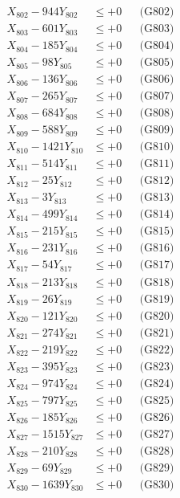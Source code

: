 \documentclass[a4paper,10pt]{article}
\begin{document}
{\begin{align}
X_{802} - 944Y_{802} &\leq +0 && \text{(G802)} \\
X_{803} - 601Y_{803} &\leq +0 && \text{(G803)} \\
X_{804} - 185Y_{804} &\leq +0 && \text{(G804)} \\
X_{805} - 98Y_{805} &\leq +0 && \text{(G805)} \\
X_{806} - 136Y_{806} &\leq +0 && \text{(G806)} \\
X_{807} - 265Y_{807} &\leq +0 && \text{(G807)} \\
X_{808} - 684Y_{808} &\leq +0 && \text{(G808)} \\
X_{809} - 588Y_{809} &\leq +0 && \text{(G809)} \\
X_{810} - 1421Y_{810} &\leq +0 && \text{(G810)} \\
\allowbreak
X_{811} - 514Y_{811} &\leq +0 && \text{(G811)} \\
X_{812} - 25Y_{812} &\leq +0 && \text{(G812)} \\
X_{813} - 3Y_{813} &\leq +0 && \text{(G813)} \\
X_{814} - 499Y_{814} &\leq +0 && \text{(G814)} \\
X_{815} - 215Y_{815} &\leq +0 && \text{(G815)} \\
X_{816} - 231Y_{816} &\leq +0 && \text{(G816)} \\
X_{817} - 54Y_{817} &\leq +0 && \text{(G817)} \\
X_{818} - 213Y_{818} &\leq +0 && \text{(G818)} \\
X_{819} - 26Y_{819} &\leq +0 && \text{(G819)} \\
X_{820} - 121Y_{820} &\leq +0 && \text{(G820)} \\
\allowbreak
X_{821} - 274Y_{821} &\leq +0 && \text{(G821)} \\
X_{822} - 219Y_{822} &\leq +0 && \text{(G822)} \\
X_{823} - 395Y_{823} &\leq +0 && \text{(G823)} \\
X_{824} - 974Y_{824} &\leq +0 && \text{(G824)} \\
X_{825} - 797Y_{825} &\leq +0 && \text{(G825)} \\
X_{826} - 185Y_{826} &\leq +0 && \text{(G826)} \\
X_{827} - 1515Y_{827} &\leq +0 && \text{(G827)} \\
X_{828} - 210Y_{828} &\leq +0 && \text{(G828)} \\
X_{829} - 69Y_{829} &\leq +0 && \text{(G829)} \\
X_{830} - 1639Y_{830} &\leq +0 && \text{(G830)} \\

\end{align}}
\end{document}
